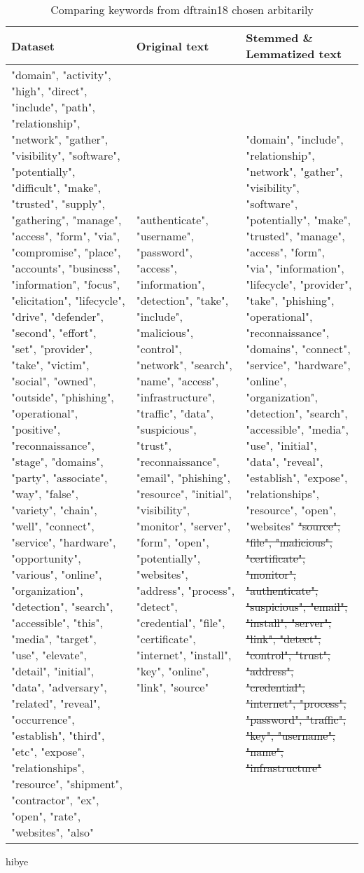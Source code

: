 \begin{table}[h]
    \caption{Comparing keywords from dftrain18 chosen arbitarily}
    \label{crouch}
    \begin{tabularx}{\textwidth}{p{}XX}
        \toprule
        \textbf{Dataset} & \textbf{Original text} & \textbf{Stemmed \& Lemmatized text} \\
        \midrule
        "domain", "activity", "high", "direct", "include", "path", "relationship", "network", "gather", "visibility", "software", "potentially", "difficult", "make", "trusted", "supply", "gathering", "manage", "access", "form", "via", "compromise", "place", "accounts", "business", "information", "focus", "elicitation", "lifecycle", "drive", "defender", "second", "effort", "set", "provider", "take", "victim", "social", "owned", "outside", "phishing", "operational", "positive", "reconnaissance", "stage", "domains", "party", "associate", "way", "false", "variety", "chain", "well", "connect", "service", "hardware", "opportunity", "various", "online", "organization", "detection", "search", "accessible", "this", "media", "target", "use", "elevate", "detail", "initial", "data", "adversary", "related", "reveal", "occurrence", "establish", "third", "etc", "expose", "relationships", "resource", "shipment", "contractor", "ex", "open", "rate", "websites", "also"
        &
        "authenticate", "username", "password", "access", "information", "detection", "take", "include", "malicious", "control", "network", "search", "name", "access", "infrastructure", "traffic", "data", "suspicious", "trust", "reconnaissance", "email", "phishing", "resource", "initial", "visibility", "monitor", "server", "form", "open", "potentially", "websites", "address", "process", "detect", "credential", "file", "certificate", "internet", "install", "key", "online", "link", "source"
        &
        "domain", "include", "relationship", "network", "gather", "visibility", "software", "potentially", "make", "trusted", "manage", "access", "form", "via", "information", "lifecycle", "provider", "take", "phishing", "operational", "reconnaissance", "domains", "connect", "service", "hardware", "online", "organization", "detection", "search", "accessible", "media", "use", "initial", "data", "reveal", "establish", "expose", "relationships", "resource", "open", "websites" \sout{"source", "file", "malicious", "certificate", "monitor", "authenticate", "suspicious", "email", "install", "server", "link", "detect", "control", "trust", "address", "credential", "internet", "process", "password", "traffic", "key", "username", "name", "infrastructure"} \\
        \bottomrule
    \end{tabularx}
\end{table}
hibye
